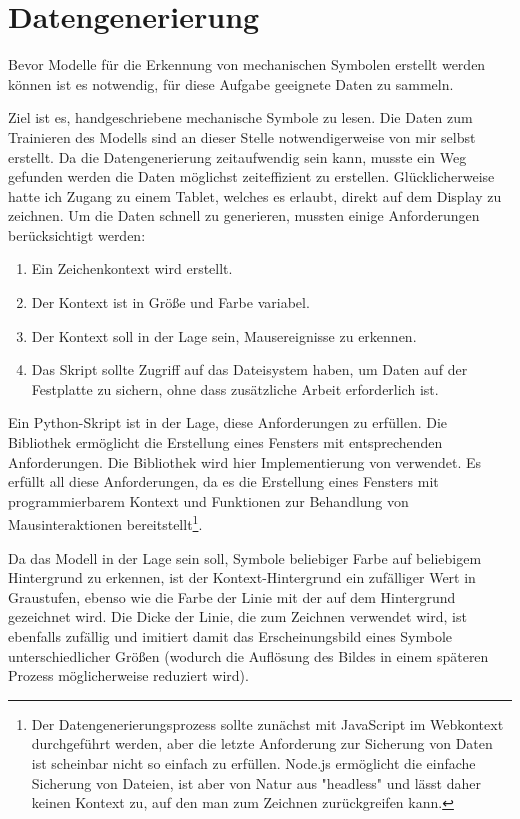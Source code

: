\section{Datengenerierung}

Bevor Modelle für die Erkennung von
mechanischen Symbolen erstellt werden können ist es notwendig, für diese Aufgabe geeignete Daten zu sammeln.

Ziel ist es, handgeschriebene mechanische Symbole zu lesen.
Die Daten zum Trainieren des Modells sind an dieser Stelle notwendigerweise von mir selbst erstellt.
Da die Datengenerierung zeitaufwendig sein kann, musste ein Weg gefunden werden die Daten möglichst zeiteffizient zu erstellen.
Glücklicherweise hatte ich Zugang zu einem Tablet, welches es erlaubt, direkt auf dem Display zu zeichnen.
Um die Daten schnell zu generieren, mussten einige Anforderungen berücksichtigt werden:

\begin{enumerate}
    \item Ein Zeichenkontext wird erstellt.
    \item Der Kontext ist in Größe und Farbe variabel.
    \item Der Kontext soll in der Lage sein, Mausereignisse zu erkennen.
    \item Das Skript sollte Zugriff auf das Dateisystem haben, um Daten auf der Festplatte zu sichern, ohne dass zusätzliche Arbeit erforderlich ist.
\end{enumerate}

Ein Python-Skript ist in der Lage, diese Anforderungen zu erfüllen.
Die Bibliothek  \cite{OpenCV2019} ermöglicht die Erstellung eines Fensters mit entsprechenden Anforderungen. Die Bibliothek  \cite{Heinisuo2019} wird hier Implementierung von  verwendet.
Es erfüllt all diese Anforderungen, da es die Erstellung eines Fensters mit programmierbarem Kontext und Funktionen zur Behandlung von Mausinteraktionen bereitstellt\footnote{ Der Datengenerierungsprozess sollte zunächst mit JavaScript im Webkontext durchgeführt werden, aber die letzte Anforderung zur Sicherung von Daten ist scheinbar nicht so einfach zu erfüllen. Node.js ermöglicht die einfache Sicherung von Dateien, ist aber von Natur aus "headless" und lässt daher keinen Kontext zu, auf den man zum Zeichnen zurückgreifen kann. }.

Da das Modell in der Lage sein soll, Symbole beliebiger Farbe auf beliebigem Hintergrund zu erkennen, ist der Kontext-Hintergrund ein zufälliger Wert in Graustufen, ebenso wie die Farbe der Linie mit der auf dem Hintergrund gezeichnet wird.
Die Dicke der Linie, die zum Zeichnen verwendet wird, ist ebenfalls zufällig und imitiert damit das Erscheinungsbild eines Symbole unterschiedlicher Größen (wodurch die Auflösung des Bildes in einem späteren Prozess möglicherweise reduziert wird).

